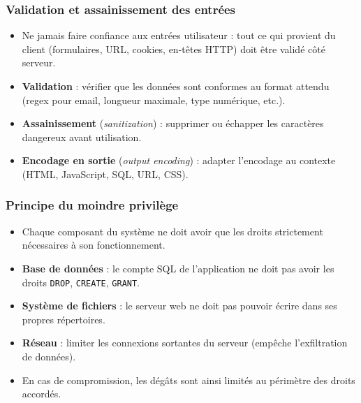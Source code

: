 \documentclass{beamer}
\begin{document}
\begin{frame}
\frametitle{Validation et assainissement des entrées}

\begin{itemize}
\item \alert{Ne jamais faire confiance aux entrées utilisateur} : tout ce qui provient du client (formulaires, URL, cookies, en-têtes HTTP) doit être validé côté serveur.
\item \textbf{Validation} : vérifier que les données sont conformes au format attendu (regex pour email, longueur maximale, type numérique, etc.).
\item \textbf{Assainissement} (\textit{sanitization}) : supprimer ou échapper les caractères dangereux avant utilisation.
\item \textbf{Encodage en sortie} (\textit{output encoding}) : adapter l'encodage au contexte (HTML, JavaScript, SQL, URL, CSS).
\end{itemize}
\end{frame}


\begin{frame}
\frametitle{Principe du moindre privilège}

\begin{itemize}
\item Chaque composant du système ne doit avoir que les \alert{droits strictement nécessaires} à son fonctionnement.
\item \textbf{Base de données} : le compte SQL de l'application ne doit pas avoir les droits \texttt{DROP}, \texttt{CREATE}, \texttt{GRANT}.
\item \textbf{Système de fichiers} : le serveur web ne doit pas pouvoir écrire dans ses propres répertoires.
\item \textbf{Réseau} : limiter les connexions sortantes du serveur (empêche l'exfiltration de données).
\item En cas de compromission, les dégâts sont ainsi \alert{limités} au périmètre des droits accordés.
\end{itemize}
\end{frame}
\end{document}
